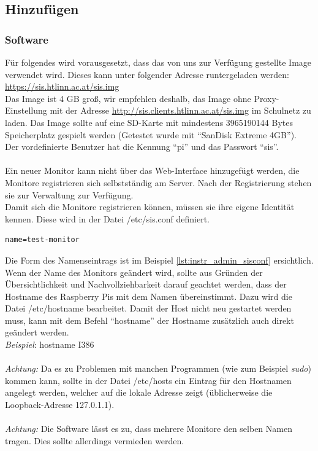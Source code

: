 \subsection{Hinzufügen}

\subsubsection{Software}
\label{sec:instr_monitor_software}
Für folgendes wird vorausgesetzt, dass das von uns zur Verfügung gestellte Image verwendet wird. Dieses kann unter folgender Adresse runtergeladen werden:\\ \href{https://sis.htlinn.ac.at/sis.img}{https://sis.htlinn.ac.at/sis.img}\\
Das Image ist 4 GB groß, wir empfehlen deshalb, das Image ohne Proxy-Einstellung mit der Adresse \href{http://sis.clients.htlinn.ac.at/sis.img}{http://sis.clients.htlinn.ac.at/sis.img} im Schulnetz zu laden. Das Image sollte auf eine SD-Karte mit mindestens 3965190144 Bytes Speicherplatz gespielt werden (Getestet wurde mit \enquote{SanDisk Extreme 4GB}).\\
Der vordefinierte Benutzer hat die Kennung \enquote{pi} und das Passwort \enquote{sis}.\\
\\
Ein neuer Monitor kann nicht über das Web-Interface hinzugefügt werden, die Monitore registrieren sich selbstständig am Server. Nach der Registrierung stehen sie zur Verwaltung zur Verfügung.\\
Damit sich die Monitore registrieren können, müssen sie ihre eigene Identität kennen. Diese wird in der Datei /etc/sis.conf definiert.\\

\begin{lstlisting}[style=custom,  caption={Beispiel /etc/sis.conf},label={lst:instr_admin_sisconf}]
name=test-monitor
\end{lstlisting}
Die Form des Namenseintrags ist im Beispiel  \autoref{lst:instr_admin_sisconf} ersichtlich.\\
Wenn der Name des Monitors geändert wird, sollte aus Gründen der Übersichtlichkeit und Nachvollziehbarkeit darauf geachtet werden, dass der Hostname des Raspberry Pis mit dem Namen übereinstimmt. Dazu wird die Datei /etc/hostname bearbeitet. Damit der Host nicht neu gestartet werden muss, kann mit dem Befehl \enquote{hostname} der Hostname zusätzlich auch direkt geändert werden. \\
\textit{Beispiel}: hostname I386\\
\\
\textit{Achtung:} Da es zu Problemen mit manchen Programmen (wie zum Beispiel \textit{sudo}) kommen kann, sollte in der Datei /etc/hosts ein Eintrag für den Hostnamen angelegt werden, welcher auf die lokale Adresse zeigt (üblicherweise die Loopback-Adresse 127.0.1.1).\\
\\
\textit{Achtung:} Die Software lässt es zu, dass mehrere Monitore den selben Namen tragen. Dies sollte allerdings vermieden werden.

